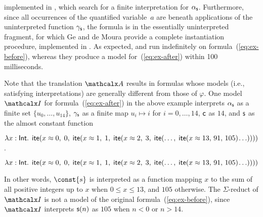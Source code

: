 \begin{example}
implemented in \cvc, which search for a finite interpretation for $\alpha_{\mathsf{s}}$. 
Furthermore, since all occurrences of the quantified variable~$a$ are 
beneath applications of the uninterpreted function $\gamma_{\mathsf{s}}$, 
the formula is in the essentially uninterpreted fragment,
for which Ge and de Moura \cite{GeDeM-CAV-09} provide 
a complete instantiation procedure, implemented in \ziii. 
As expected,
\cvc and \ziii run indefinitely on formula~(\ref{eq:ex-before}), 
whereas they produce a model for~(\ref{eq:ex-after}) 
within 100 milliseconds.\xend
\end{example}

\newcommand\badlambda{\lambda x : \typeint.\allowbreak\;\, \lite( x \teq 0,\allowbreak\; 0,\allowbreak\;
  \lite( x \teq 1,\allowbreak\; 1,\allowbreak\;
    \lite( x \teq 2,\allowbreak\; 3,\allowbreak\;
      \lite(\ldots,\allowbreak\; \lite( x \teq 13,\allowbreak\, 91,\allowbreak\, 105 )\negvthinspace \ldots ))))}

Note that the translation $\conv$ results in formulas whose models
(i.e., satisfying interpretations) are generally different from those of $\varphi$.
One model $\I$ for formula~(\ref{eq:ex-after}) in the above example interprets
$\alpha_{\mathsf{s}}$ as a finite set $\{ u_0, \ldots, u_{14} \}$,
$\gamma_{\mathsf{s}}$ as a finite map $u_i \mapsto i$ for $i = 0, \ldots, 14$,
$\mathsf{c}$ as $14$,
and $\mathsf{s}$ as the almost constant function
%
\begin{shortv}$\badlambda$. \end{shortv}%
\begin{longv}\[\badlambda\]\end{longv}%
%
In other words, $\const{s}$ is interpreted as a function mapping $x$ to the sum
of all positive integers up to $x$ when $0 \leq x \leq 13$, and $105$
otherwise.
The $\Sigma$-reduct of $\I$ is not a model of the original formula~(\ref{eq:ex-before}),
since $\I$ 
interprets $\mathsf{s}( n )$ as $105$ when $n < 0$ or $n > 14$.

